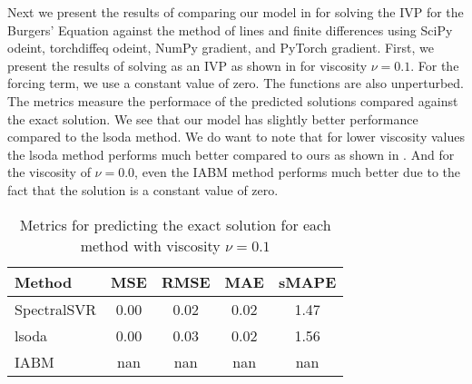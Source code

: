 Next we present the results of comparing our model in for solving the IVP for the Burgers' Equation against the method of lines and finite differences using SciPy odeint, torchdiffeq odeint, NumPy gradient, and PyTorch gradient. First, we present the results of solving  as an IVP as shown in  for viscosity \(\nu=0.1\). For the forcing term, we use a constant value of zero. The functions are also unperturbed. The metrics measure the performace of the predicted solutions compared against the exact solution. We see that our model has slightly better performance compared to the lsoda method. We do want to note that for lower viscosity values the lsoda method performs much better compared to ours as shown in . And for the viscosity of \(\nu=0.0\), even the IABM method performs much better due to the fact that the solution is a constant value of zero.
\begin{table}[H]
  \caption{Metrics for predicting the exact solution for each method with viscosity \(\nu=0.1\)}\label{table:comparison_exact_metrics_0.1}
  \centering
  \begin{tabular}{lcccc}
    \toprule
    Method      & MSE  & RMSE & MAE  & sMAPE \\
    \midrule
    SpectralSVR & 0.00 & 0.02 & 0.02 & 1.47  \\
    lsoda       & 0.00 & 0.03 & 0.02 & 1.56  \\
    IABM        & nan  & nan  & nan  & nan   \\
    \bottomrule
  \end{tabular}
\end{table}


